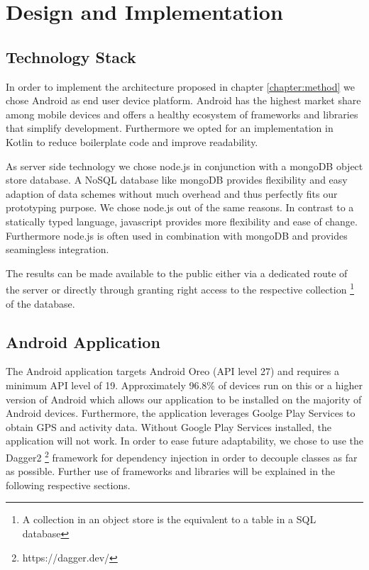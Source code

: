 \chapter{Design and Implementation}\label{chapter:design}

\section{Technology Stack}
In order to implement the architecture proposed in chapter \ref{chapter:method} we chose Android as end user device platform. Android has the highest market share \cite{android-market-share} among mobile devices and offers a healthy ecosystem of frameworks and libraries that simplify development. Furthermore we opted for an implementation in Kotlin to reduce boilerplate code and improve readability.

As server side technology we chose node.js in conjunction with a mongoDB object store database. A NoSQL database like mongoDB provides flexibility and easy adaption of data schemes without much overhead and thus perfectly fits our prototyping purpose. We chose node.js out of the same reasons. In contrast to a statically typed language, javascript provides more flexibility and ease of change. Furthermore node.js is often used in combination with mongoDB and provides seamingless integration.

The results can be made available to the public either via a dedicated route of the server or directly through granting right access to the respective collection \footnote{A collection in an object store is the equivalent to a table in a SQL database} of the database.

\section{Android Application}
The Android application targets Android Oreo (API level 27) and requires a minimum API level of 19. Approximately 96.8\% of devices run on this or a higher version of Android \cite{android-api-level-share} which allows our application to be installed on the majority of Android devices.
Furthermore, the application leverages Goolge Play Services to obtain GPS and activity data. Without Google Play Services installed, the application will not work. In order to ease future adaptability, we chose to use the Dagger2 \footnote{https://dagger.dev/} framework for dependency injection in order to decouple classes as far as possible. Further use of frameworks and libraries will be explained in the following respective sections.

